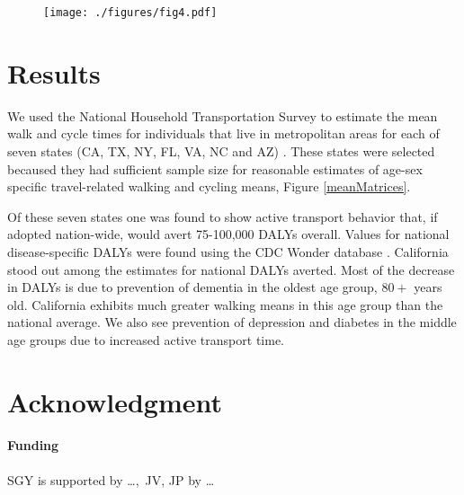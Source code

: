 \documentclass{bioinfo}
\begin{document}
\begin{figure}[t]
  \centerline{\texttt{[image: ./figures/fig4.pdf]}}
    \caption{}\label{California}
\end{figure}

\section{Results}

We used the National Household Transportation Survey to estimate the
mean walk and cycle times for individuals that live in metropolitan
areas for each of seven states (CA, TX, NY, FL, VA, NC and AZ)
\cite{NHTS}.  These states were selected becaused they had sufficient
sample size for reasonable estimates of age-sex specific
travel-related walking and cycling means, Figure \ref{meanMatrices}.

Of these seven states one was found to show active transport behavior
that, if adopted nation-wide, would avert 75-100,000 DALYs overall.
Values for national disease-specific DALYs were found using the CDC
Wonder database \cite{CDCWonder}.  California stood out among the
estimates for national DALYs averted.  Most of the decrease in DALYs
is due to prevention of dementia in the oldest age group, $80+$ years
old.  California exhibits much greater walking means in this age group
than the national average.  We also see prevention of depression and
diabetes in the middle age groups due to increased active transport
time.

\section*{Acknowledgment}
\paragraph{Funding\textcolon} SGY is supported by \ldots,\ JV, JP by \ldots

%

%

\end{document}
